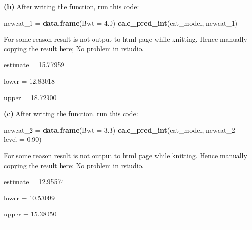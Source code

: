 \documentclass[
]{article}
\newenvironment{Shaded}{\begin{snugshade}}{\end{snugshade}}
\newcommand{\DataTypeTok}[1]{\textcolor[rgb]{0.13,0.29,0.53}{#1}}
\newcommand{\DecValTok}[1]{\textcolor[rgb]{0.00,0.00,0.81}{#1}}
\newcommand{\FloatTok}[1]{\textcolor[rgb]{0.00,0.00,0.81}{#1}}
\newcommand{\KeywordTok}[1]{\textcolor[rgb]{0.13,0.29,0.53}{\textbf{#1}}}
\newcommand{\NormalTok}[1]{#1}
\newcommand{\StringTok}[1]{\textcolor[rgb]{0.31,0.60,0.02}{#1}}
\begin{document}
\textbf{(b)} After writing the function, run this code:

\begin{Shaded}
\begin{Highlighting}[]
\NormalTok{newcat_}\DecValTok{1}\NormalTok{ =}\StringTok{ }\KeywordTok{data.frame}\NormalTok{(}\DataTypeTok{Bwt =} \FloatTok{4.0}\NormalTok{)}
\KeywordTok{calc_pred_int}\NormalTok{(cat_model, newcat_}\DecValTok{1}\NormalTok{)}
\end{Highlighting}
\end{Shaded}

For some reason result is not output to html page while knitting. Hence
manually copying the result here; No problem in rstudio.

estimate = 15.77959

lower = 12.83018

upper = 18.72900

\textbf{(c)} After writing the function, run this code:

\begin{Shaded}
\begin{Highlighting}[]
\NormalTok{newcat_}\DecValTok{2}\NormalTok{ =}\StringTok{ }\KeywordTok{data.frame}\NormalTok{(}\DataTypeTok{Bwt =} \FloatTok{3.3}\NormalTok{)}
\KeywordTok{calc_pred_int}\NormalTok{(cat_model, newcat_}\DecValTok{2}\NormalTok{, }\DataTypeTok{level =} \FloatTok{0.90}\NormalTok{)}
\end{Highlighting}
\end{Shaded}

For some reason result is not output to html page while knitting. Hence
manually copying the result here; No problem in rstudio.

estimate = 12.95574

lower = 10.53099

upper = 15.38050

\begin{center}\rule{0.5\linewidth}{0.5pt}\end{center}
\end{document}
